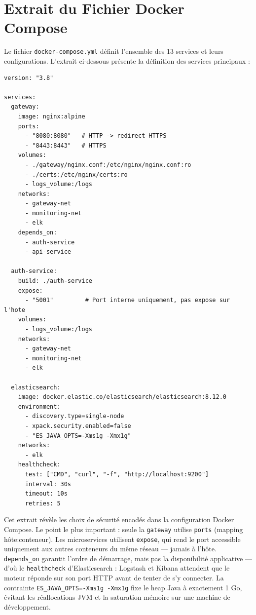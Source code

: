 \documentclass[12pt, a4paper]{report}
\begin{document}
\chapter{Extrait du Fichier Docker Compose}

Le fichier \texttt{docker-compose.yml} définit l'ensemble des 13 services et leurs configurations. L'extrait ci-dessous présente la définition des services principaux :

\begin{lstlisting}[style=yaml, caption={Extrait docker-compose.yml * API Gateway et Auth Service}]
version: "3.8"

services:
  gateway:
    image: nginx:alpine
    ports:
      - "8080:8080"   # HTTP -> redirect HTTPS
      - "8443:8443"   # HTTPS
    volumes:
      - ./gateway/nginx.conf:/etc/nginx/nginx.conf:ro
      - ./certs:/etc/nginx/certs:ro
      - logs_volume:/logs
    networks:
      - gateway-net
      - monitoring-net
      - elk
    depends_on:
      - auth-service
      - api-service

  auth-service:
    build: ./auth-service
    expose:
      - "5001"         # Port interne uniquement, pas expose sur l'hote
    volumes:
      - logs_volume:/logs
    networks:
      - gateway-net
      - monitoring-net
      - elk

  elasticsearch:
    image: docker.elastic.co/elasticsearch/elasticsearch:8.12.0
    environment:
      - discovery.type=single-node
      - xpack.security.enabled=false
      - "ES_JAVA_OPTS=-Xms1g -Xmx1g"
    networks:
      - elk
    healthcheck:
      test: ["CMD", "curl", "-f", "http://localhost:9200"]
      interval: 30s
      timeout: 10s
      retries: 5
\end{lstlisting}

\medskip
Cet extrait révèle les choix de sécurité encodés dans la configuration Docker Compose. Le point le plus important : seule la \texttt{gateway} utilise \texttt{ports} (mapping hôte:conteneur). Les microservices utilisent \texttt{expose}, qui rend le port accessible uniquement aux autres conteneurs du même réseau — jamais à l'hôte. \texttt{depends\_on} garantit l'ordre de démarrage, mais pas la disponibilité applicative — d'où le \texttt{healthcheck} d'Elasticsearch : Logstash et Kibana attendent que le moteur réponde sur son port HTTP avant de tenter de s'y connecter. La contrainte \texttt{ES\_JAVA\_OPTS=-Xms1g -Xmx1g} fixe le heap Java à exactement 1 Go, évitant les réallocations JVM et la saturation mémoire sur une machine de développement.
\end{document}

